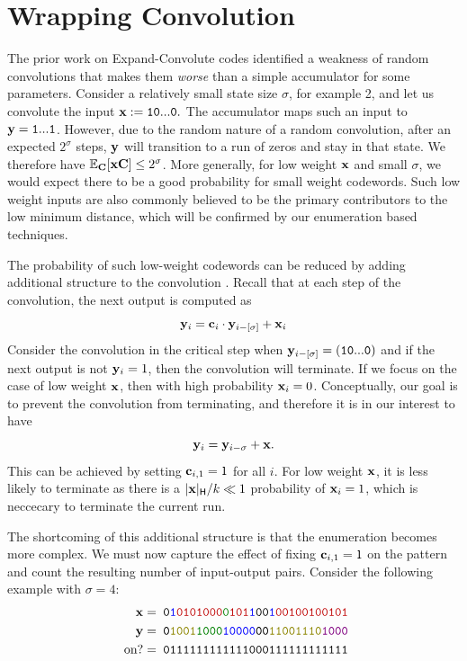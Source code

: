 

\section{Wrapping Convolution}

The prior work on Expand-Convolute codes \cite{EC} identified a weakness of random convolutions that makes them \emph{worse} than a simple accumulator for some parameters. Consider a relatively small state size $\sigma$, for example 2, and let us convolute the input
$
\mathbf{x}:=\texttt{10}...\texttt{0}.
$
The accumulator maps such an input to $\mathbf{y}=\texttt{1}...\texttt{1}$. However, due to the random nature of a random convolution, after an expected $2^\sigma$ steps, $\mathbf{y}$ will transition to a run of zeros and stay in that state. We therefore have $\mathbb{E}_{\mathbf{C}}[\mathbf{x}\mathbf{C}]\leq 2^\sigma$. More generally, for low weight $\mathbf{x}$ and small $\sigma$, we would expect there to be a good probability for small weight codewords. Such low weight inputs are also commonly believed to be the primary contributors to the low minimum distance, which will be confirmed by our enumeration based techniques.

The probability of such low-weight codewords can be reduced by adding additional structure to the convolution \cite{EC}. Recall that at each step of the convolution, the next output is computed as
$$
\mathbf{y}_i=\mathbf{c}_i\cdot \mathbf{y}_{i-[\sigma]} + \mathbf{x}_i
$$
Consider the convolution in the critical step when $\mathbf{y}_{i-[\sigma]}=(\texttt{10}...\texttt{0})$ and if the next output is not $\mathbf{y}_i=1$, then the convolution will terminate. If we focus on the case of low weight $\mathbf{x}$, then with high probability $\mathbf{x}_i=0$. Conceptually, our goal is to prevent the convolution from terminating, and therefore it is in our interest to have
$$
\mathbf{y}_i = \mathbf{y}_{i-\sigma} +\mathbf{x}.
$$
This can be achieved by setting $\mathbf{c}_{i,1}=1$ for all $i$. For low weight $\mathbf{x}$, it is less likely to terminate as there is a $|\mathbf{x}|_\mathsf{H}/k \ll 1$ probability of $\mathbf{x}_i=1$, which is neccecary to terminate the current run.

The shortcoming of this additional structure is that the enumeration becomes more complex. We must now capture the effect of fixing $\mathbf{c}_{i,1}=1$ on the pattern and count the resulting number of input-output pairs. Consider the following example with $\sigma = 4$:
\begin{align*}
  \xv=&\texttt{ 0\textcolor{blue}{1}\red{0101000}\green{0}\red{101}\textcolor{blue}{1}00\textcolor{blue}{1}\red{00100100101}}\\
  \yv=&\texttt{ 0\olive{1001}\green{1000}\textcolor{blue}{10000}00\olive{11001110}\textcolor{violet}{1000}}\\
  \text{ on?}=&\texttt{ 0111111111111000111111111111}%
\end{align*}

